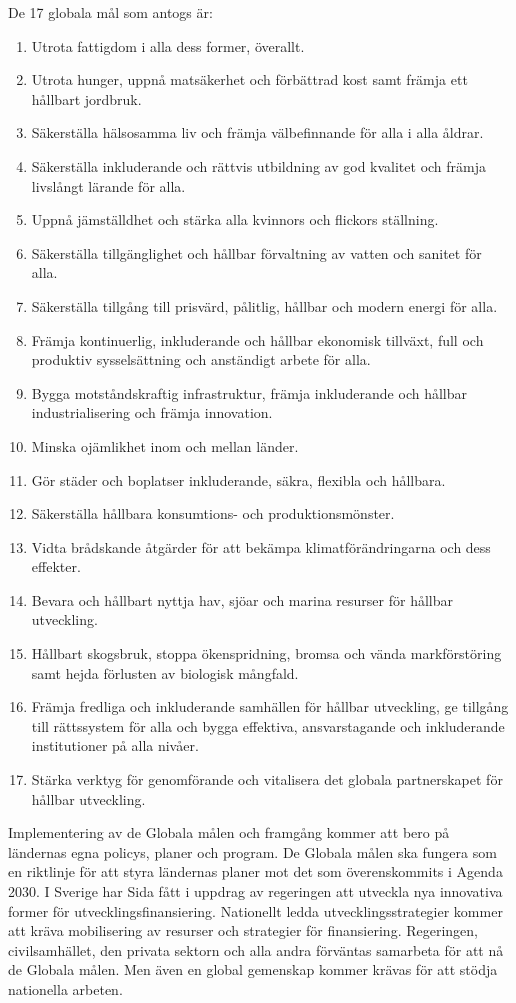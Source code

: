 \documentclass{report}
\begin{document}
 De 17 globala mål som antogs är: 
\begin{enumerate}
\item Utrota fattigdom i alla dess former, överallt.
\item Utrota hunger, uppnå matsäkerhet och förbättrad kost samt främja ett hållbart jordbruk.
\item Säkerställa hälsosamma liv och främja välbefinnande för alla i alla åldrar.
\item Säkerställa inkluderande och rättvis utbildning av god kvalitet och främja livslångt lärande för alla.
\item Uppnå jämställdhet och stärka alla kvinnors och flickors ställning.
\item Säkerställa tillgänglighet och hållbar förvaltning av vatten och sanitet för alla.
\item Säkerställa tillgång till prisvärd, pålitlig, hållbar och modern energi för alla.
\item Främja kontinuerlig, inkluderande och hållbar ekonomisk tillväxt, full och produktiv sysselsättning och anständigt arbete för alla.
\item Bygga motståndskraftig infrastruktur, främja inkluderande och hållbar industrialisering och främja innovation.
\item Minska ojämlikhet inom och mellan länder.
\item Gör städer och boplatser inkluderande, säkra, flexibla och hållbara.
\item Säkerställa hållbara konsumtions- och produktionsmönster.
\item Vidta brådskande åtgärder för att bekämpa klimatförändringarna och dess effekter.
\item Bevara och hållbart nyttja hav, sjöar och marina resurser för hållbar utveckling.
\item Hållbart skogsbruk, stoppa ökenspridning, bromsa och vända markförstöring samt hejda förlusten av biologisk mångfald.
\item Främja fredliga och inkluderande samhällen för hållbar utveckling, ge tillgång till rättssystem för alla och bygga effektiva, ansvarstagande och inkluderande institutioner på alla nivåer.
\item Stärka verktyg för genomförande och vitalisera det globala partnerskapet för hållbar utveckling. \cite{webKTH}
\end{enumerate}

Implementering av de Globala målen och framgång kommer att bero på ländernas egna policys, planer och program. De Globala målen ska fungera som en riktlinje för att styra ländernas planer mot det som överenskommits i Agenda 2030. \cite{web2030agenda}
I Sverige har Sida fått i uppdrag av regeringen att utveckla nya innovativa former för utvecklingsfinansiering. \cite{webSIDA}
Nationellt ledda utvecklingsstrategier kommer att kräva mobilisering av resurser och strategier för finansiering. Regeringen, civilsamhället, den privata sektorn och alla andra förväntas samarbeta för att nå de Globala målen. Men även en global gemenskap kommer krävas för att stödja nationella arbeten.\\
\end{document}
